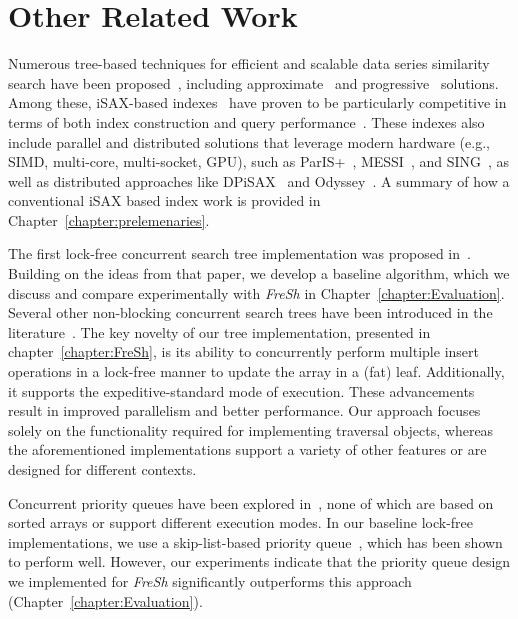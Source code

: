 \section{Other Related Work}
Numerous tree-based techniques for efficient and scalable data series similarity search
have been proposed~\cite{DBLP:journals/pvldb/EchihabiZPB18, DBLP:journals/pvldb/EchihabiZPB19,
DBLP:conf/edbt/EchihabiZP21, DBLP:journals/pvldb/EchihabiPZ21},
including approximate~\cite{DBLP:journals/pvldb/AziziEP23, 
DBLP:journals/kais/LevchenkoKYAMPS21} and 
progressive~\cite{DBLP:conf/sigmod/GogolouTEBP20, DBLP:journals/tvcg/JoSF20,
DBLP:conf/sigmod/LiZAH20, DBLP:journals/vldb/EchihabiTGBP23} solutions.
Among these, iSAX-based indexes~\cite{isaxfamily} have proven to be particularly
competitive in terms of both index construction and query performance~\cite{DBLP:journals/pvldb/EchihabiZPB18,
DBLP:journals/pvldb/EchihabiZPB19, hercules, odyssey, dumpy}. These indexes also include
parallel and distributed solutions that leverage modern hardware (e.g., SIMD, multi-core,
multi-socket, GPU), such as ParIS+~\cite{parisplus}, MESSI~\cite{PFP21-I}, and SING~\cite{PFP21-II},
as well as distributed approaches like DPiSAX~\cite{dpisax, dpisaxjournal} and
Odyssey~\cite{odyssey}. A summary of how a conventional iSAX based index work is provided in 
Chapter~\ref{chapter:prelemenaries}.
 
The first lock-free concurrent search tree implementation was proposed in~\cite{EFRB10}.
Building on the ideas from that paper, we develop a baseline algorithm, which we discuss
and compare experimentally with \textit{FreSh} in Chapter~\ref{chapter:Evaluation}.
Several other non-blocking concurrent search trees have been introduced in the 
literature~\cite{BER14, HL16, ABF20, HJ12, NRM20, CNT14, BP12, EFHR14, FR2018, ABF+22}.
The key novelty of our tree implementation, presented in chapter~\ref{chapter:FreSh}, is its
ability to concurrently perform multiple insert operations in a lock-free manner to
update the array in a (fat) leaf. Additionally, it supports the expeditive-standard mode
of execution. These advancements result in improved parallelism and better performance.
Our approach focuses solely on the functionality required for implementing traversal objects,
whereas the aforementioned implementations support a variety of other features or are designed
for different contexts.
 
Concurrent priority queues have been explored in~\cite{AK15-I, RT21, WG15, SUNDELL2005609,
tamir_et_al, LJ13}, none of which are based on sorted arrays or support different
execution modes. In our baseline lock-free implementations, we use a skip-list-based
priority queue~\cite{LJ13}, which has been shown to perform well. However, our experiments
indicate that the priority queue design we implemented for \textit{FreSh} significantly
outperforms this approach (Chapter~\ref{chapter:Evaluation}).
 
